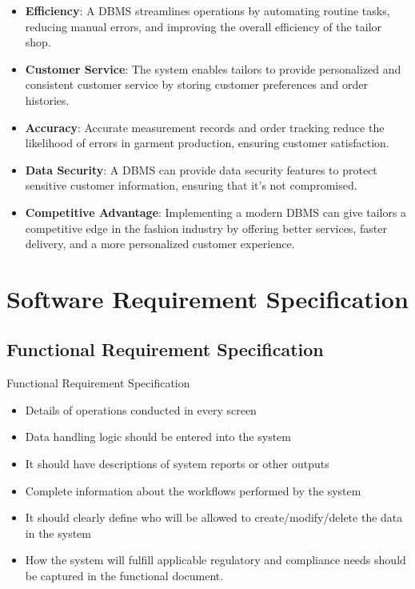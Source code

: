 \documentclass[12pt, letter paper]{report}
\begin{document}
{\begin{spacing}{1.5}
\begin{itemize}
\subsection{Importance:}
\item\textbf{Efficiency}: A DBMS streamlines operations by automating routine tasks, reducing manual errors, and improving the overall efficiency of the tailor shop.
\item\textbf{Customer Service}: The system enables tailors to provide personalized and consistent customer service by storing customer preferences and order histories.
\item\textbf{Accuracy}: Accurate measurement records and order tracking reduce the likelihood of errors in garment production, ensuring customer satisfaction.
\item \textbf{Data Security}: A DBMS can provide data security features to protect sensitive customer information, ensuring that it's not compromised.
\item \textbf{Competitive Advantage}: Implementing a modern DBMS can give tailors a competitive edge in the fashion industry by offering better services, faster delivery, and a more personalized customer experience.
\end{itemize}
\end{spacing}
\chapter{Software Requirement Specification}

\section{Functional Requirement Specification} 
Functional  Requirement Specification
\begin{itemize}
\item Details of operations conducted in every screen
\item Data handling logic should be entered into the system
\item It should have descriptions of system reports or other outputs
\item Complete information about the workflows performed by the system
\item It should clearly define who will be allowed to create/modify/delete the data in the system
\item How the system will fulfill applicable regulatory and compliance needs should be captured in the functional document.
\end{itemize}
}
\end{document}
